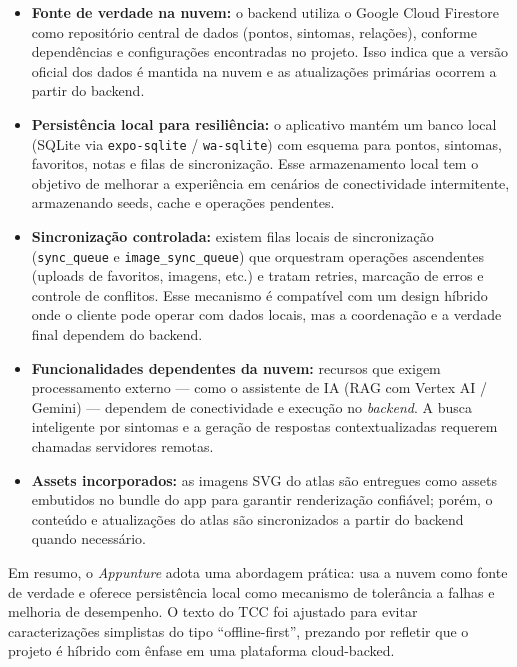 \begin{itemize}
	\item \textbf{Fonte de verdade na nuvem:} o backend utiliza o Google Cloud Firestore como repositório central de dados (pontos, sintomas, relações), conforme dependências e configurações encontradas no projeto. Isso indica que a versão oficial dos dados é mantida na nuvem e as atualizações primárias ocorrem a partir do backend.

	\item \textbf{Persistência local para resiliência:} o aplicativo mantém um banco local (SQLite via \texttt{expo-sqlite} / \texttt{wa-sqlite}) com esquema para pontos, sintomas, favoritos, notas e filas de sincronização. Esse armazenamento local tem o objetivo de melhorar a experiência em cenários de conectividade intermitente, armazenando seeds, cache e operações pendentes.

	\item \textbf{Sincronização controlada:} existem filas locais de sincronização (\texttt{sync\_queue} e \texttt{image\_sync\_queue}) que orquestram operações ascendentes (uploads de favoritos, imagens, etc.) e tratam retries, marcação de erros e controle de conflitos. Esse mecanismo é compatível com um design híbrido onde o cliente pode operar com dados locais, mas a coordenação e a verdade final dependem do backend.

	\item \textbf{Funcionalidades dependentes da nuvem:} recursos que exigem processamento externo — como o assistente de IA (RAG com Vertex AI / Gemini) — dependem de conectividade e execução no \textit{backend}. A busca inteligente por sintomas e a geração de respostas contextualizadas requerem chamadas servidores remotas.

	\item \textbf{Assets incorporados:} as imagens SVG do atlas são entregues como assets embutidos no bundle do app para garantir renderização confiável; porém, o conteúdo e atualizações do atlas são sincronizados a partir do backend quando necessário.
\end{itemize}

Em resumo, o \textit{Appunture} adota uma abordagem prática: usa a nuvem como fonte de verdade e oferece persistência local como mecanismo de tolerância a falhas e melhoria de desempenho. O texto do TCC foi ajustado para evitar caracterizações simplistas do tipo ``offline-first'', prezando por refletir que o projeto é híbrido com ênfase em uma plataforma cloud-backed.
